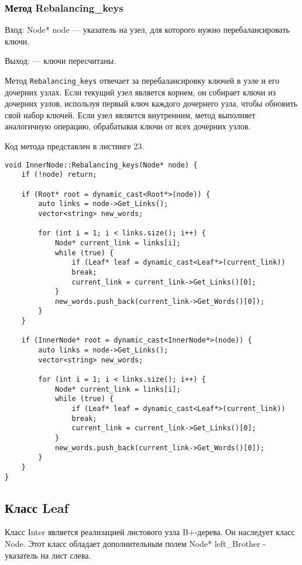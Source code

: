 \documentclass[10pt,a4paper,final]{article} %
\begin{document}
\subsubsection{Метод Rebalancing\_keys}
Вход: Node* node — указатель на узел, для которого нужно перебалансировать ключи. \par
Выход: — ключи пересчитаны. \par
\par Метод \texttt{Rebalancing\_keys} отвечает за перебалансировку ключей в узле и его дочерних узлах. Если текущий узел является корнем, он собирает ключи из дочерних узлов, используя первый ключ каждого дочернего узла, чтобы обновить свой набор ключей. Если узел является внутренним, метод выполняет аналогичную операцию, обрабатывая ключи от всех дочерних узлов.

Код метода представлен в листинге 23. \begin{lstlisting}[label=rebalancingKeysInnerNodeMethod, caption = Метод Rebalancing\_keys для класса InnerNode]
void InnerNode::Rebalancing_keys(Node* node) {
	if (!node) return;
	
	if (Root* root = dynamic_cast<Root*>(node)) {
		auto links = node->Get_Links();
		vector<string> new_words;
		
		for (int i = 1; i < links.size(); i++) {
			Node* current_link = links[i];
			while (true) {
				if (Leaf* leaf = dynamic_cast<Leaf*>(current_link))
				break;
				current_link = current_link->Get_Links()[0];
			}
			new_words.push_back(current_link->Get_Words()[0]);
		}
	}
	
	if (InnerNode* root = dynamic_cast<InnerNode*>(node)) {
		auto links = node->Get_Links();
		vector<string> new_words;
		
		for (int i = 1; i < links.size(); i++) {
			Node* current_link = links[i];
			while (true) {
				if (Leaf* leaf = dynamic_cast<Leaf*>(current_link))
				break;
				current_link = current_link->Get_Links()[0];
			}
			new_words.push_back(current_link->Get_Words()[0]);
		}
	}
}\end{lstlisting}



\subsection{Класс Leaf}
Класс Inter является реализацией листового узла B+-дерева. Он наследует класс Node. Этот класс обладает дополнительным полем Node* left\_Brother - указатель на лист слева.
\end{document}
